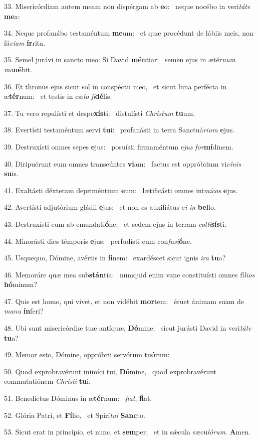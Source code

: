 33. Misericórdiam autem meam non dispérgam ab \textbf{e}o: \ast\  neque nocébo in veri\textit{tá}\textit{te} \textbf{me}a:\

34. Neque profanábo testaméntum \textbf{me}um: \ast\  et quæ procédunt de lábiis meis, non fá\textit{ci}\textit{am} \textbf{ír}rita.\

35. Semel jurávi in sancto meo: Si David \textbf{mén}tiar: \ast\  semen ejus in ætér\textit{num} \textit{ma}\textbf{né}bit.\

36. Et thronus ejus sicut sol in conspéctu meo, \dag\  et sicut luna perfécta in æ\textbf{tér}num: \ast\  et testis in cæ\textit{lo} \textit{fi}\textbf{dé}lis.\

37. Tu vero repulísti et despe\textbf{xís}ti: \ast\  distulísti \textit{Chris}\textit{tum} \textbf{tu}um.\

38. Evertísti testaméntum servi \textbf{tu}i: \ast\  profanásti in terra Sanctuá\textit{ri}\textit{um} \textbf{e}jus.\

39. Destruxísti omnes sepes \textbf{e}jus: \ast\  posuísti firmaméntum e\textit{jus} \textit{for}\textbf{mí}dinem.\

40. Diripuérunt eum omnes transeúntes \textbf{vi}am: \ast\  factus est oppróbrium vi\textit{cí}\textit{nis} \textbf{su}is.\

41. Exaltásti déxteram depriméntium \textbf{e}um: \ast\  lætificásti omnes ini\textit{mí}\textit{cos} \textbf{e}jus.\

42. Avertísti adjutórium gládii \textbf{e}jus: \ast\  et non es auxiliátus e\textit{i} \textit{in} \textbf{bel}lo.\

43. Destruxísti eum ab emundati\textbf{ó}ne: \ast\  et sedem ejus in terram \textit{col}\textit{li}\textbf{sís}ti.\

44. Minorásti dies témporis \textbf{e}jus: \ast\  perfudísti eum con\textit{fu}\textit{si}\textbf{ó}ne.\

45. Usquequo, Dómine, avértis in \textbf{fi}nem: \ast\  exardéscet sicut ignis \textit{i}\textit{ra} \textbf{tu}a?\

46. Memoráre quæ mea sub\textbf{stán}tia: \ast\  numquid enim vane constituísti omnes fí\textit{li}\textit{os} \textbf{hó}minum?\

47. Quis est homo, qui vivet, et non vidébit \textbf{mor}tem: \ast\  éruet ánimam suam de \textit{ma}\textit{nu} \textbf{ín}feri?\

48. Ubi sunt misericórdiæ tuæ antíquæ, \textbf{Dó}mine: \ast\  sicut jurásti David in veri\textit{tá}\textit{te} \textbf{tu}a?\

49. Memor esto, Dómine, oppróbrii servórum tu\textbf{ó}rum: \ast\  \

50. Quod exprobravérunt inimíci tui, \textbf{Dó}mine, \ast\  quod exprobravérunt commutatiónem \textit{Chris}\textit{ti} \textbf{tu}i.\

51. Benedíctus Dóminus in æ\textbf{tér}num: \ast\  \textit{fi}\textit{at}, \textbf{fi}at.\

52. Glória Patri, et \textbf{Fí}lio, \ast\  et Spirí\textit{tu}\textit{i} \textbf{Sanc}to.\

53. Sicut erat in princípio, et nunc, et \textbf{sem}per, \ast\  et in sǽcula sæcu\textit{ló}\textit{rum}. \textbf{A}men.\

